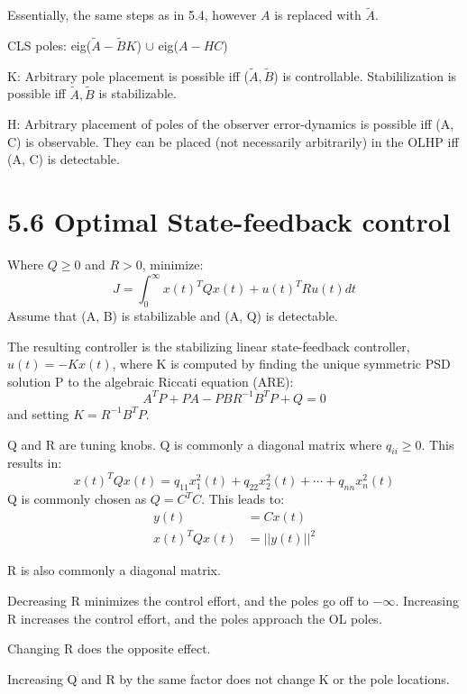 Essentially, the same steps as in 5.4, however \( A \) is replaced with \( \tilde{A} \).

CLS poles: eig(\(\tilde{A}-\tilde{B}K\)) \(\cup\) eig(\(A - HC\))

K: Arbitrary pole placement is possible iff (\(\tilde{A}, \tilde{B}\)) is controllable.
Stabililization is possible iff \(\tilde{A}, \tilde{B}\) is stabilizable.

H: Arbitrary placement of poles of the observer error-dynamics is possible iff (A, C) is observable.
They can be placed (not necessarily arbitrarily) in the OLHP iff (A, C) is detectable.

\section*{5.6 Optimal State-feedback control}

Where \( Q \geq 0 \) and \( R > 0 \), minimize:
\begin{equation*}
    J=\int_0^\infty x(t)^T Q x(t) + u(t)^T R u(t) dt
\end{equation*}
Assume that (A, B) is stabilizable and (A, Q) is detectable.

The resulting controller is the stabilizing linear state-feedback controller, \( u(t) = -Kx(t) \), where K is computed by finding the unique symmetric PSD solution P to the algebraic Riccati equation (ARE):
\begin{equation*}
    A^T P + PA - PBR^{-1}B^TP + Q = 0
\end{equation*}
and setting \( K = R^{-1}B^T P\).

Q and R are tuning knobs. Q is commonly a diagonal matrix where \( q_{ii} \geq 0 \).
This results in:
\begin{equation*}
    x(t)^T Qx(t) = q_{11}x_1^2(t) + q_{22}x_2^2(t) + \cdots + q_{nn} x_n^2(t)
\end{equation*}
Q is commonly chosen as \( Q = C^T C \). This leads to:
\begin{equation*}
    \begin{aligned}
        y(t)         & = Cx(t)      \\
        x(t)^T Qx(t) & = ||y(t)||^2
    \end{aligned}
\end{equation*}

R is also commonly a diagonal matrix.

Decreasing R minimizes the control effort, and the poles go off to \( -\infty \).
Increasing R increases the control effort, and the poles approach the OL poles.

Changing R does the opposite effect.

Increasing Q and R by the same factor does not change K or the pole locations.
